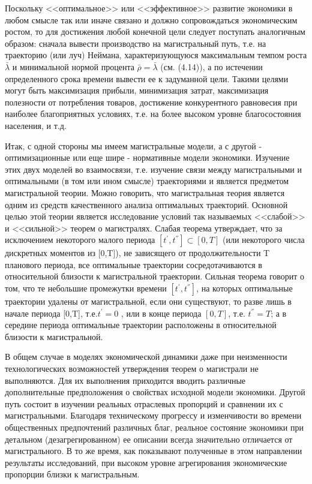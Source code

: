 \documentclass[12pt, 4paper]{book}
\begin{document}
{Поскольку <<оптимальное>> или <<эффективное>> развитие экономики в любом смысле так или иначе связано и должно сопровождаться экономическим ростом, то для достижения любой конечной цели следует поступать аналогичным образом: сначала вывести производство на магистральный путь, т.е. на траекторию (или луч) Неймана, характеризующуюся максимальным темпом роста $\bar{\lambda}$ и минимальной нормой процента $\bar{\rho}=\bar{\lambda}$ (см. (4.14)), а по истечении определенного срока времени вывести ее к задуманной цели. Такими целями могут быть максимизация прибыли, минимизация затрат, максимизация полезности от потребления товаров, достижение конкурентного равновесия при наиболее благоприятных условиях, т.е. на более высоком уровне благосостояния населения, и т.д.
\par

Итак, с одной стороны мы имеем магистральные модели, а с другой - оптимизационные или еще шире - нормативные модели экономики. Изучение этих двух моделей во взаимосвязи, т.е. изучение связи между магистральными и оптимальными (в том или ином смысле) траекториями и является предметом магистральной теории. Можно говорить, что магистральная теория является одним из средств качественного анализа оптимальных траекторий. Основной целью этой теории является исследование условий так называемых <<слабой>> и <<сильной>> теорем о магистралях. Слабая теорема утверждает, что за исключением некоторого малого периода $[t^{'},t^{''}] \subset [0,T]$ (или некоторого числа дискретных моментов из [0,T]), не зависящего от продолжительности T планового периода, все оптимальные траектории сосредотачиваются в относительной близости к магистральной траектории. Сильная теорема говорит о том, что те небольшие промежутки времени $[t^{'},t^{''}]$, на которых оптимальные траектории удалены от магистральной, если они существуют, то разве лишь в начале периода [0,T], т.е.$t^{'} = 0$ , или в конце периода $[0,T]$, т.е. $t^{''}=T$; а в середине периода оптимальные траектории расположены в относительной близости к магистральной.
\par

В общем случае в моделях экономической динамики даже при неизменности технологических возможностей утверждения теорем о магистрали не выполняются. Для их выполнения приходится вводить различные дополнительные предположения о свойствах исходной модели экономики. Другой путь состоит в изучении реальных отраслевых пропорций и сравнении их с магистральными. Благодаря техническому прогрессу и изменчивости во времени общественных предпочтений различных благ, реальное состояние экономики при детальном (дезагрегированном) ее описании всегда значительно отличается от магистрального. В то же время, как показывают полученные в этом направлении результаты исследований, при высоком уровне агрегирования экономические пропорции близки к магистральным.
\par

}
\end{document}

